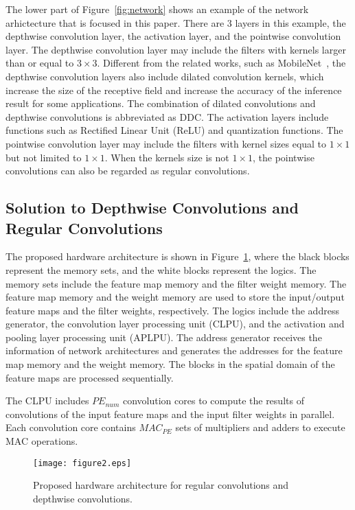 \documentclass[runningheads]{llncs}
\begin{document}
The lower part of Figure~\ref{fig:network} shows an example of the network arhictecture that is focused in this paper. There are 3 layers in this example, the depthwise convolution layer, the activation layer, and the pointwise convolution layer. The depthwise convolution layer may include the filters with kernels larger than or equal to $3 \times 3$. Different from the related works, such as MobileNet~\cite{Howard17}, the depthwise convolution layers also include dilated convolution kernels, which increase the size of the receptive field and increase the accuracy of the inference result for some applications. The combination of dilated convolutions and depthwise convolutions is abbreviated as DDC. The activation layers include functions such as Rectified Linear Unit (ReLU) and quantization functions. The pointwise convolution layer may include the filters with kernel sizes equal to $1 \times 1$ but not limited to $1 \times 1$. When the kernels size is not $1 \times 1$, the pointwise convolutions can also be regarded as regular convolutions.

\subsection{Solution to Depthwise Convolutions and Regular Convolutions}
\label{subsec:solution}

The proposed hardware architecture is shown in Figure~\ref{fig:architecture}, where the black blocks represent the memory sets, and the white blocks represent the logics. The memory sets include the feature map memory and the filter weight memory. The feature map memory and the weight memory are used to store the input/output feature maps and the filter weights, respectively. The logics include the address generator, the convolution layer processing unit (CLPU), and the activation and pooling layer processing unit (APLPU). The address generator receives the information of network architectures and generates the addresses for the feature map memory and the weight memory. The blocks in the spatial domain of the feature maps are processed sequentially.

The CLPU includes $PE_{num}$ convolution cores to compute the results of convolutions of the input feature maps and the input filter weights in parallel. Each convolution core contains $MAC_{PE}$ sets of multipliers and adders to execute MAC operations.

\begin{figure}
\centering
\texttt{[image: figure2.eps]}
\caption{Proposed hardware architecture for regular convolutions and depthwise convolutions.}
\label{fig:architecture}
\end{figure}
\end{document}
